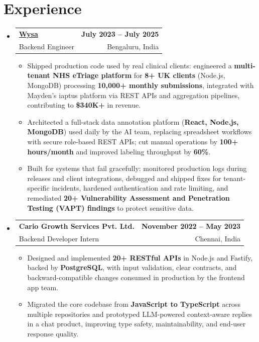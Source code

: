 \documentclass[letterpaper,10pt]{article}
\makeatletter
\newcommand{\resumeItem}[1]{
  \item\small{#1\vspace{-1pt}}
}
\newcommand{\resumeSubheading}[4]{
  \vspace{1pt}\item
    \begin{tabular*}{0.985\textwidth}[t]{l@{\extracolsep{\fill}}r}
      \textbf{#1} & \textbf{\small #2} \\
      {\small\color{ResumeSlate} #3} & {\small\color{ResumeSlate} #4} \\
    \end{tabular*}\vspace{-6pt}
}
\newcommand{\resumeSubHeadingListStart}{\begin{itemize}[leftmargin=0.0in, label={}, itemsep=2pt, topsep=2pt]}
\newcommand{\resumeSubHeadingListEnd}{\end{itemize}}
\newcommand{\resumeItemListStart}{\begin{itemize}[leftmargin=0.18in, itemsep=2pt, topsep=1pt]}
\newcommand{\resumeItemListEnd}{\end{itemize}\vspace{-4pt}}
\makeatother
\begin{document}
\section{Experience}
\resumeSubHeadingListStart
  \resumeSubheading
    {\href{https://www.wysa.io}{Wysa}}{July 2023 -- July 2025}
    {Backend Engineer}{Bengaluru, India}
    \resumeItemListStart
      \resumeItem{Shipped production code used by real clinical clients: engineered a \textbf{multi-tenant NHS eTriage platform} for \textbf{8+ UK clients} (Node.js, MongoDB) processing \textbf{10{,}000+ monthly submissions}, integrated with Mayden's iaptus platform via REST APIs and aggregation pipelines, contributing to \textbf{\$340K+} in revenue.}
      \resumeItem{Architected a full-stack data annotation platform (\textbf{React, Node.js, MongoDB}) used daily by the AI team, replacing spreadsheet workflows with secure role-based REST APIs; cut manual operations by \textbf{100+ hours/month} and improved labeling throughput by \textbf{60\%}.}
      \resumeItem{Built for systems that fail gracefully: monitored production logs during releases and client integrations, debugged and shipped fixes for tenant-specific incidents, hardened authentication and rate limiting, and remediated \textbf{20+ Vulnerability Assessment and Penetration Testing (VAPT) findings} to protect sensitive data.}
    \resumeItemListEnd
  \resumeSubheading
    {Cario Growth Services Pvt. Ltd.}{November 2022 -- May 2023}
    {Backend Developer Intern}{Chennai, India}
    \resumeItemListStart
      \resumeItem{Designed and implemented \textbf{20+ RESTful APIs} in Node.js and Fastify, backed by \textbf{PostgreSQL}, with input validation, clear contracts, and backward-compatible changes consumed in production by the frontend app team.}
      \resumeItem{Migrated the core codebase from \textbf{JavaScript to TypeScript} across multiple repositories and prototyped LLM-powered context-aware replies in a chat product, improving type safety, maintainability, and end-user response quality.}
    \resumeItemListEnd
\resumeSubHeadingListEnd
\vspace{-4pt}
\end{document}
